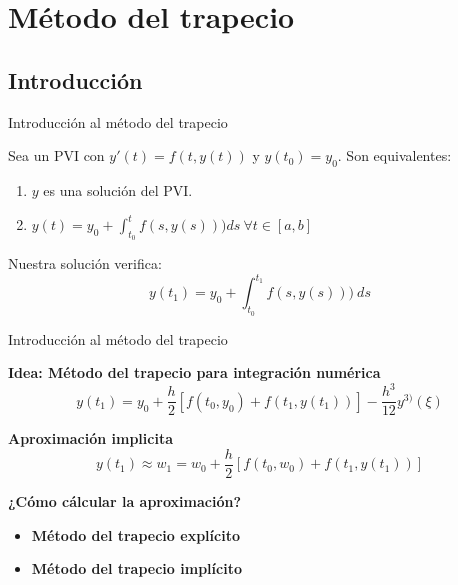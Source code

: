 \section{Método del trapecio}

	\subsection{Introducción}

		\begin{frame}{Introducción al método del trapecio}
			\fontsize{11}{11}\selectfont				
			\begin{proposition} \label{prop:sol-eq}
				Sea un PVI con $y'(t) = f(t,y(t))$ y $y(t_0) = y_0$.  Son equivalentes:
				\begin{enumerate}
					\item $y$ es una solución del PVI.
					\item $y(t) = y_0 + \int_{t_0}^{t} f(s,y(s))) ds \ \forall t \in [a,b]$
				\end{enumerate}
			\end{proposition}

			\kern 7mm
			\begin{tcolorbox}[colback=ChetwodeBlue!10,colframe=ChetwodeBlue!60]
				Nuestra solución verifica:
				\begin{equation*}
					y(t_1)  = y_0 + \int_{t_0}^{t_1} f(s,y(s))) \ ds
				\end{equation*}		
			\end{tcolorbox}
		\end{frame}

		\begin{frame}{Introducción al método del trapecio}
			\fontsize{10}{10}\selectfont				

			\begin{tcolorbox}[colback=ChetwodeBlue!10,colframe=ChetwodeBlue!60]
				\centering
				\textbf{Idea: Método del trapecio para integración numérica}
				\begin{equation} \label{eq:trapecio-igualdad}
					y(t_{1}) = y_0 + \frac{h}{2} \left[f(t_0,y_0) + f(t_1, y(t_1))\right] - \frac{h^3}{12}y^{3)}(\xi)
				\end{equation}

				\textbf{Aproximación implicita}	
				\begin{equation} \label{eq:app}
					y(t_1) \approx w_1 = w_0 + \frac{h}{2} \left[f(t_0,w_0) + f(t_1, y(t_1))\right]
				\end{equation}			
			\end{tcolorbox}			

			\kern 1mm
			\centering
			\textbf{¿Cómo cálcular la aproximación?}

			\kern 1mm
			\begin{itemize}
				\item \color{ChetwodeBlue}\textbf{Método del trapecio explícito}
				\item \color{ChetwodeBlue}\textbf{Método del trapecio implícito}
			\end{itemize}
		\end{frame}


